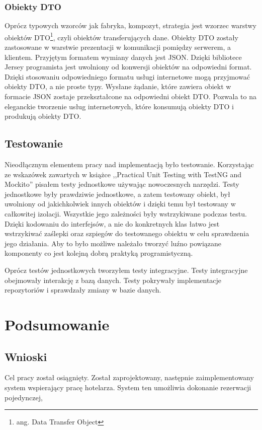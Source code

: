 \documentclass[a4paper,onecolumn,oneside,11pt,wide,floatssmall]{mwrep}
\theoremstyle{definition}
\theoremstyle{plain}%
\theoremstyle{remark}
\begin{document}
\subsection{Obiekty DTO}
Oprócz typowych wzorców jak fabryka, kompozyt, strategia jest wzorzec warstwy obiektów DTO\footnote{ang. Data Transfer Object}, czyli obiektów transferujących dane. Obiekty DTO zostały zastosowane w warstwie prezentacji w komunikacji pomiędzy serwerem, a klientem. Przyjętym formatem wymiany danych jest JSON. Dzięki bibliotece Jersey programista jest uwolniony od konwersji obiektów na odpowiedni format. Dzięki stosowaniu odpowiedniego formatu usługi internetowe mogą przyjmować obiekty DTO, a nie proste typy. Wysłane żądanie, które zawiera obiekt w formacie JSON zostaje przekształcone na odpowiedni obiekt DTO. Pozwala to na eleganckie tworzenie usług internetowych, które konsumują obiekty DTO i produkują obiekty DTO.

\section{Testowanie}
Nieodłącznym elementem pracy nad implementacją było testowanie. Korzystając ze wskazówek zawartych w książce ,,Practical Unit Testing with TestNG and Mockito'' \cite{kaczanowski2012practical} pisałem testy jednostkowe używając nowoczesnych narzędzi. Testy jednostkowe były prawdziwie jednostkowe, a zatem testowany obiekt, był uwolniony od jakichkolwiek innych obiektów i dzięki temu był testowany w całkowitej izolacji. Wszystkie jego zależności były wstrzykiwane podczas testu. Dzięki kodowaniu do interfejsów, a nie do konkretnych klas łatwo jest wstrzykiwać zaślepki oraz szpiegów do testowanego obiektu w celu sprawdzenia jego działania. Aby to było możliwe należało tworzyć luźno powiązane komponenty co jest kolejną dobrą praktyką programistyczną.

Oprócz testów jednostkowych tworzyłem testy integracyjne. Testy integracyjne obejmowały interakcję z bazą danych. Testy pokrywały implementacje repozytoriów i sprawdzały zmiany w bazie danych. 

\chapter{Podsumowanie}

\section{Wnioski}
Cel pracy został osiągnięty. Został zaprojektowany, następnie zaimplementowany system wspierający pracę hotelarza. System ten umożliwia dokonanie rezerwacji pojedynczej, 
\end{document}
